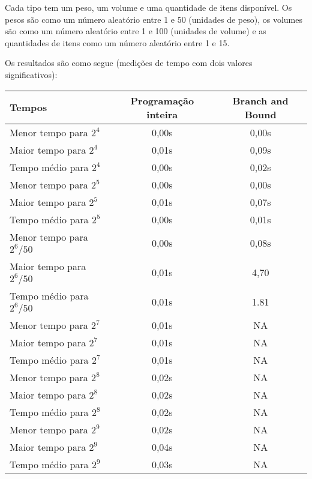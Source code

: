 \documentclass{article}
\begin{document}
  Cada tipo
  tem um peso, um volume e uma quantidade de itens disponível. Os
  pesos são como um número aleatório entre 1 e 50 (unidades de peso),
  os volumes são como um número aleatório entre 1 e 100 (unidades de
  volume) e as quantidades de itens como um número aleatório entre 1 e
  15.

  Os resultados são como segue (medições de tempo com dois valores
  significativos):

  \begin{center}
    \bgroup
    \def\arraystretch{1.25}
    \begin{tabular}{| l | c | c |}
      \hline
      Tempos & Programação inteira & Branch and Bound \\
      \hline
      \hline
      Menor tempo para $2^4$ & 0,00s & 0,00s \\
      Maior tempo para $2^4$ & 0,01s & 0,09s \\
      Tempo médio para $2^4$ & 0,00s & 0,02s \\
      \hline

      Menor tempo para $2^5$ & 0,00s & 0,00s \\
      Maior tempo para $2^5$ & 0,01s & 0,07s \\
      Tempo médio para $2^5$ & 0,00s & 0,01s \\
      \hline

      Menor tempo para $2^6/50$ & 0,00s & 0,08s \\
      Maior tempo para $2^6/50$ & 0,01s & 4,70 \\
      Tempo médio para $2^6/50$ & 0,01s & 1.81 \\
      \hline

      Menor tempo para $2^7$ & 0,01s & NA \\
      Maior tempo para $2^7$ & 0,01s & NA \\
      Tempo médio para $2^7$ & 0,01s & NA \\
      \hline

      Menor tempo para $2^8$ & 0,02s & NA \\
      Maior tempo para $2^8$ & 0,02s & NA \\
      Tempo médio para $2^8$ & 0,02s & NA \\
      \hline

      Menor tempo para $2^9$ & 0,02s & NA \\
      Maior tempo para $2^9$ & 0,04s & NA \\
      Tempo médio para $2^9$ & 0,03s & NA \\
      \hline


\end{tabular}
\end{center}
\end{document}
